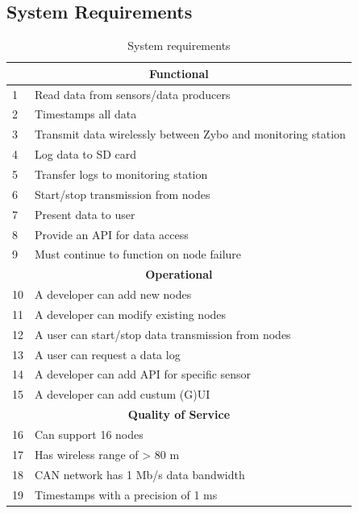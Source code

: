 \subsection{System Requirements} %
\label{sec:system_requirements}
\begin{table}[H]
\centering
\caption{System requirements}
\label{tab:requirements}

\begin{tabular}{ |p{0.3cm}|p{10.5cm}| }
\hline
\multicolumn{2}{|c|}{\textbf{Functional}}\\
\hline
1 & Read data from sensors/data producers 				\\
2 & Timestamps all data 								\\
3 & Transmit data wirelessly between Zybo and monitoring station	\\
4 & Log data to SD card 								\\
5 & Transfer logs to monitoring station 								\\
6 & Start/stop transmission from nodes 					\\
7 & Present data to user								\\
8 & Provide an API for data access						\\
9 & Must continue to function on node failure			\\

\hline
\multicolumn{2}{|c|}{\textbf{Operational}}\\
\hline	
10 & A developer can add new nodes 										 \\
11 & A developer can modify existing nodes 								 \\
12 & A user can start/stop data transmission from nodes					 \\
13 & A user can request a data log 										 \\
14 & A developer can add API for specific sensor 						 \\
15 & A developer can add custum (G)UI									 \\


\hline
\multicolumn{2}{|c|}{\textbf{Quality of Service}}\\
\hline	
16 & Can support 16 nodes							 					\\
17 & Has wireless range of > 80 m						 				\\
18 & CAN network has 1 Mb/s data bandwidth			 					\\
19 & Timestamps with a precision of 1 ms 			 					\\


\end{tabular}
\end{table}
